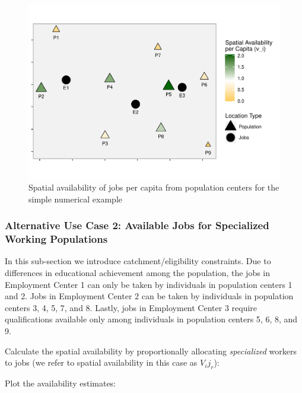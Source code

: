 \documentclass[]{elsarticle} %
\begin{document}
\begin{figure}
\includegraphics[width=1\linewidth]{Spatial-Availability_files/figure-latex/toy-example-availability-jobs-per-capita-1} \caption{\label{fig:toy-example-availability-jobs-per-capita}Spatial availability of jobs per capita from population centers for the simple numerical example}\label{fig:toy-example-availability-jobs-per-capita}
\end{figure}

\hypertarget{alternative-use-case-2-available-jobs-for-specialized-working-populations}{%
\subsubsection{Alternative Use Case 2: Available Jobs for Specialized
Working
Populations}\label{alternative-use-case-2-available-jobs-for-specialized-working-populations}}

In this sub-section we introduce catchment/eligibility constraints. Due
to differences in educational achievement among the population, the jobs
in Employment Center 1 can only be taken by individuals in population
centers 1 and 2. Jobs in Employment Center 2 can be taken by individuals
in population centers 3, 4, 5, 7, and 8. Lastly, jobs in Employment
Center 3 require qualifications available only among individuals in
population centers 5, 6, 8, and 9.

Calculate the spatial availability by proportionally allocating
\emph{specialized} workers to jobs (we refer to spatial availability in
this case as \(V_ij_r\)):

Plot the availability estimates:
\end{document}
